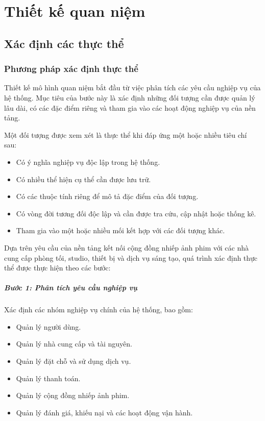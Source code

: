 \chapter{Thiết kế quan niệm}

\section{Xác định các thực thể}

\subsection{Phương pháp xác định thực thể}

Thiết kế mô hình quan niệm bắt đầu từ việc phân tích các yêu cầu nghiệp vụ của hệ thống. Mục tiêu của bước này là xác định những đối tượng cần được quản lý lâu dài, có các đặc điểm riêng và tham gia vào các hoạt động nghiệp vụ của nền tảng.

Một đối tượng được xem xét là thực thể khi đáp ứng một hoặc nhiều tiêu chí sau:

\begin{itemize}
\item Có ý nghĩa nghiệp vụ độc lập trong hệ thống.
\item Có nhiều thể hiện cụ thể cần được lưu trữ.
\item Có các thuộc tính riêng để mô tả đặc điểm của đối tượng.
\item Có vòng đời tương đối độc lập và cần được tra cứu, cập nhật hoặc thống kê.
\item Tham gia vào một hoặc nhiều mối kết hợp với các đối tượng khác.

\end{itemize}
Dựa trên yêu cầu của nền tảng kết nối cộng đồng nhiếp ảnh phim với các nhà cung cấp phòng tối, studio, thiết bị và dịch vụ sáng tạo, quá trình xác định thực thể được thực hiện theo các bước:

\paragraph{Bước 1: Phân tích yêu cầu nghiệp vụ}\mbox{}\par
Xác định các nhóm nghiệp vụ chính của hệ thống, bao gồm:

\begin{itemize}
\item Quản lý người dùng.
\item Quản lý nhà cung cấp và tài nguyên.
\item Quản lý đặt chỗ và sử dụng dịch vụ.
\item Quản lý thanh toán.
\item Quản lý cộng đồng nhiếp ảnh phim.
\item Quản lý đánh giá, khiếu nại và các hoạt động vận hành.

\end{itemize}
